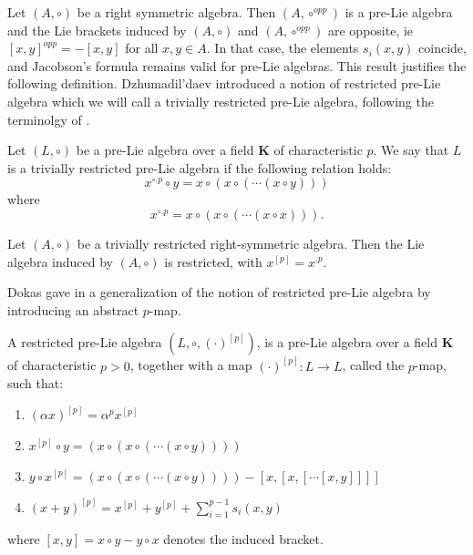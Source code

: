 \documentclass[11pt, twoside]{article}
\begin{document}
 Let $(A,\circ) $ be a right symmetric algebra. Then $(A,\circ^{opp}) $ is a pre-Lie algebra and the Lie brackets induced by $(A,\circ) $ and $(A,\circ^{opp}) $ are opposite, ie $[x,y]^{opp}=-[x,y] $ for all $x,y\in A$. In that case, the elements $s_i(x,y) $ coincide, and Jacobson's formula remains valid for pre-Lie algebras. This result justifies the following definition. Dzhumadil'daev introduced a notion of restricted pre-Lie algebra which we will call a trivially restricted pre-Lie algebra, following the terminolgy of \cite{EG25}.

\begin{defi}[\cite{D01}]\label{D3.7}
    Let $(L,\circ)$ be a pre-Lie algebra over a field $\mathbf{K}$ of characteristic $p$. We say that $L$ is a trivially restricted pre-Lie algebra if the following relation holds: \begin{equation}\label{eq3}
        x^{\circ. p}\circ y = x\circ (x\circ (\cdots (x\circ y))) 
    \end{equation} where \begin{equation}
        x^{\circ .p}=x\circ (x\circ (\cdots (x\circ x)))  .
    \end{equation}
\end{defi}

\begin{prop}[\cite{D01}]\label{p3.8}
    Let $(A,\circ) $ be a trivially restricted right-symmetric algebra. Then the Lie algebra induced by $(A,\circ)$ is restricted, with $x^{[p]}= x^{.p} $. 
\end{prop}

Dokas gave in \cite{D12} a generalization of the notion of restricted pre-Lie algebra by introducing an abstract $p$-map.

\begin{defi}[\cite{D12}]
    A restricted pre-Lie algebra $(L,\circ,(\cdot)^{[p]}) $, is a pre-Lie algebra over a field $\mathbf{K} $ of characteristic $p>0$, together with a map $(\cdot)^{[p]}:L\to L $, called the $p$-map, such that: \begin{enumerate}
        \item $(\alpha x)^{[p]}= \alpha ^px^{[p]} $
        \item  $x^{[p]}\circ y = (x\circ (x\circ (\cdots (x\circ y)))) $
        \item $y\circ x^{[p]}= (x\circ (x\circ (\cdots (x\circ y)))) - [x,[x,[\cdots[x,y]]]] $
        \item $(x+y)^{[p]}= x^{[p]}+y^{[p]}+ \sum\limits_{i=1}^{p-1} s_i(x,y)$
    \end{enumerate} where $[x,y]=x\circ y - y\circ x $ denotes the induced bracket.
\end{defi}
\end{document}
